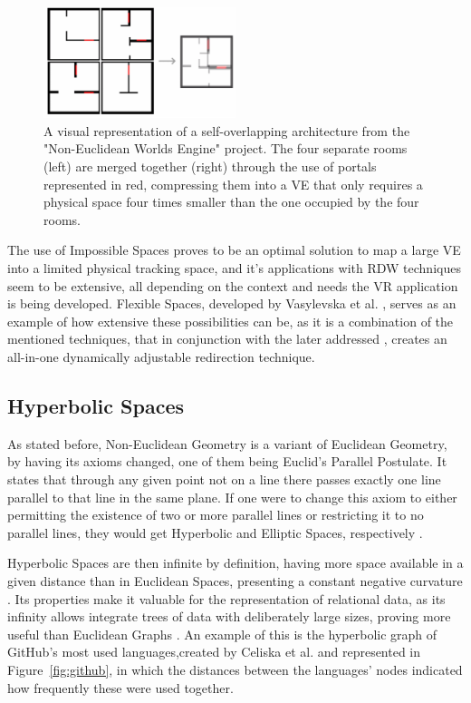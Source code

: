 \begin{figure}[t]
   \centering
    \includegraphics[width=0.5\textwidth]{NOVAthesisFiles/Images/papers/self-overlapping.png}
    \caption{A visual representation of a self-overlapping architecture from the "Non-Euclidean Worlds Engine" project.
    The four separate rooms (left) are merged together (right) through the use of portals represented in red, compressing them into a 
    \gls{VE} that only requires a physical space four times smaller than the one occupied by the four rooms.}
   \label{fig:self-Overlapping}
\end{figure}

The use of Impossible Spaces proves to be an optimal solution to map a large \gls{VE} into a limited physical tracking space, and it's applications 
with \gls{RDW} techniques seem to be extensive, all depending on the context and needs the \gls{VR} application is being developed.
Flexible Spaces, developed by Vasylevska et al. \cite{6550194}, serves as an example of how extensive these possibilities can be,
as it is a combination of the mentioned techniques, that in conjunction with the later addressed , 
creates an all-in-one dynamically adjustable redirection technique. 

\subsection{Hyperbolic Spaces}
\label{sec:hyperbolic-spaces}

As stated before, Non-Euclidean Geometry is a variant of Euclidean Geometry, by having its axioms changed, one of them 
being Euclid's Parallel Postulate.
It states that through any given point not on a line there passes exactly one line parallel to that line in the same plane\cite{Eryk2018}. 
If one were to change this axiom to either permitting the existence of two or more parallel lines or restricting it to no parallel lines, 
they would get Hyperbolic and Elliptic Spaces, respectively \cite{Pisani2019}.


Hyperbolic Spaces are then infinite by definition, having more space available in a given distance than in Euclidean Spaces, presenting a 
constant negative curvature \cite{Pisani2019}. Its properties make it valuable for the representation of relational data, as its infinity allows 
integrate trees of data with deliberately large sizes, proving more useful than Euclidean Graphs \cite{Eryk2017, Liu2019}. 
An example of this is the hyperbolic graph of GitHub's most used languages,created by Celiska et al. \cite{Celiska2017} and represented in 
Figure~\ref{fig:github}, 
in which the distances between the languages' nodes indicated how frequently these were used together.

